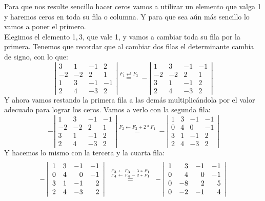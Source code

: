 \documentclass[a4paper,11pt,answers]{exam}
\begin{document}
\begin{solution}
	Para que nos resulte sencillo hacer ceros vamos a utilizar un elemento que valga 1 y haremos ceros en toda su fila o columna. Y para que sea aún más sencillo lo vamos a poner el primero.\\
	Elegimos el elemento 1,\,3, que vale 1, y vamos a cambiar toda su fila por la primera. Tenemos que recordar que al cambiar dos filas el determinante cambia de signo, con lo que:
	\[\left| \begin{array}{rrrr}
		3&1&-1&2\\
		-2&-2&2&1\\
		1&3&-1&-1\\
		2&4&-3&2
	\end{array} \right| \stackrel{F_1 \rightleftarrows F_3}{=} - \left| \begin{array}{rrrr}
	1&3&-1&-1\\
	-2&-2&2&1\\
	3&1&-1&2\\
	2&4&-3&2
\end{array}\right|\]
Y ahora vamos restando la primera fila a las demás multiplicándola por el valor adecuado para lograr los ceros. Vamos a verlo con la segunda fila:
\[- \left| \begin{array}{rrrr}
	1&3&-1&-1\\
	-2&-2&2&1\\
	3&1&-1&2\\
	2&4&-3&2
\end{array}\right| \stackrel{F_2  \leftarrow F_2 + 2*F_1}{=}
- \left| \begin{array}{rrrr}
	1&3&-1&-1\\
	0&4&0&-1\\
	3&1&-1&2\\
	2&4&-3&2
\end{array}\right|\]
Y hacemos lo mismo con la tercera y la cuarta fila:
\[- \left| \begin{array}{rrrr}
	1&3&-1&-1\\
	0&4&0&-1\\
	3&1&-1&2\\
	2&4&-3&2
\end{array}\right| \stackrel{\tiny \begin{array}{c}
	F_3 \leftarrow F_3 - 3*F_1\\
	F_4 \leftarrow F_4 - 2*F_1
\end{array}}{=} - \left| \begin{array}{rrrr}
1&3&-1&-1\\
0&4&0&-1\\
0&-8&2&5\\
0&-2&-1&4
\end{array}\right|\]


\end{solution}
\end{document}

